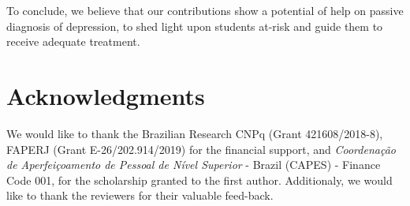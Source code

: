 \documentclass[letterpaper]{article} \usepackage{aaai20}  \usepackage{times}  \usepackage{helvet} \usepackage{courier}  \usepackage[hyphens]{url}  \usepackage{graphicx} \urlstyle{rm} \def\UrlFont{\rm}  \usepackage{graphicx}  \frenchspacing  \setlength{\pdfpagewidth}{8.5in}  \setlength{\pdfpageheight}{11in}  \usepackage[final]{changes}
\begin{document}
To conclude, we believe that our contributions show a potential of help on passive diagnosis of depression, to shed light upon students at-risk and guide them to receive adequate treatment.

\section{Acknowledgments}

We would like to thank the Brazilian Research CNPq (Grant 421608/2018-8), FAPERJ (Grant E-26/202.914/2019) for the financial support, and \textit{Coordenação de Aperfeiçoamento de Pessoal de Nível Superior} - Brazil (CAPES) - Finance Code 001, for the scholarship granted to the first author. Additionaly, we would like to thank the reviewers for their valuable feed-back.

\fontsize{9.0pt}{10.0pt}\selectfont


\end{document}
